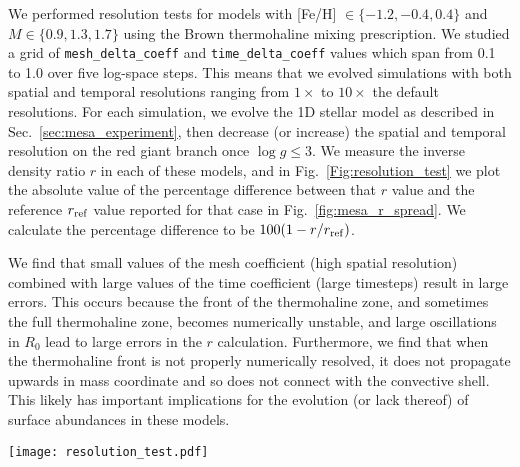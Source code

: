 We performed resolution tests for models with [Fe/H] $\in \{-1.2, -0.4, 0.4\}$ and $M \in \{0.9, 1.3, 1.7\}$ using the Brown thermohaline mixing prescription.
We studied a grid of \texttt{mesh\_delta\_coeff} and \texttt{time\_delta\_coeff} values which span from 0.1 to 1.0 over five log-space steps.
This means that we evolved simulations with both spatial and temporal resolutions ranging from $1\times$ to $10\times$ the default resolutions.
For each simulation, we evolve the 1D stellar model as described in Sec.~\ref{sec:mesa_experiment}, then decrease (or increase) the spatial and temporal resolution on the red giant branch once $\log g \leq 3$.
We measure the inverse density ratio $r$ in each of these models, and in Fig.~\ref{Fig:resolution_test} we plot the absolute value of the percentage difference between that $r$ value and the reference $r_{\rm ref}$ value reported for that case in Fig.~\ref{fig:mesa_r_spread}.
We calculate the percentage difference to be $100(1 - r/r_{\rm{ref}})$.

We find that small values of the mesh coefficient (high spatial resolution) combined with large values of the time coefficient (large timesteps) result in large errors.
This occurs because the front of the thermohaline zone, and sometimes the full thermohaline zone, becomes numerically unstable, and large oscillations in $R_0$ lead to large errors in the $r$ calculation.
Furthermore, we find that when the thermohaline front is not properly numerically resolved, it does not propagate upwards in mass coordinate and so does not connect with the convective shell.
This likely has important implications for the evolution (or lack thereof) of surface abundances in these models.


\begin{figure*}[!tb]
\begin{center}
\texttt{[image: resolution\_test.pdf]}
\caption{
    We plot a 3x3 grid of colormaps corresponding to a grid of mass $M \in [0.9, 1.3, 1.7]$ and [Fe/H]$ \in [-1.2, -0.4, 0.4]$.
    At each mass and [Fe/H], we simulate a 5x5 grid of MESA models with varying spatial and temporal resolution.
    We plot in color the percent difference between the measured value of the reduced density ratio $r$ and its reference value reported in Fig.~\ref{fig:mesa_r_spread}.
    The resolution of the grids of simulations presented in Fig.~\ref{fig:mesa_r_spread} are marked by black stars.
    Cases with $r$ measurements within 5\% of the reference values are colored in green, while points with larger differences are colored pink.
    Grey pixels are simulations for which either there was a supercomputer error or the algorithm failed to identify a thermohaline zone.
    }
\label{Fig:resolution_test}
\end{center}
\end{figure*}